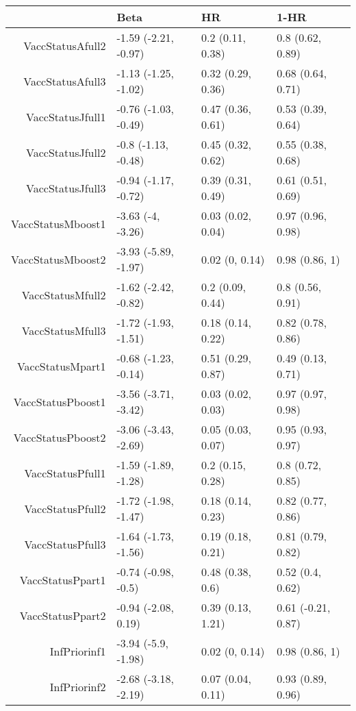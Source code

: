\begin{table}[ht]
\centering
\begin{tabular}{rlll}
  \hline
 & Beta & HR & 1-HR \\ 
  \hline
VaccStatusAfull2 & -1.59 (-2.21, -0.97) & 0.2 (0.11, 0.38) & 0.8 (0.62, 0.89) \\ 
  VaccStatusAfull3 & -1.13 (-1.25, -1.02) & 0.32 (0.29, 0.36) & 0.68 (0.64, 0.71) \\ 
  VaccStatusJfull1 & -0.76 (-1.03, -0.49) & 0.47 (0.36, 0.61) & 0.53 (0.39, 0.64) \\ 
  VaccStatusJfull2 & -0.8 (-1.13, -0.48) & 0.45 (0.32, 0.62) & 0.55 (0.38, 0.68) \\ 
  VaccStatusJfull3 & -0.94 (-1.17, -0.72) & 0.39 (0.31, 0.49) & 0.61 (0.51, 0.69) \\ 
  VaccStatusMboost1 & -3.63 (-4, -3.26) & 0.03 (0.02, 0.04) & 0.97 (0.96, 0.98) \\ 
  VaccStatusMboost2 & -3.93 (-5.89, -1.97) & 0.02 (0, 0.14) & 0.98 (0.86, 1) \\ 
  VaccStatusMfull2 & -1.62 (-2.42, -0.82) & 0.2 (0.09, 0.44) & 0.8 (0.56, 0.91) \\ 
  VaccStatusMfull3 & -1.72 (-1.93, -1.51) & 0.18 (0.14, 0.22) & 0.82 (0.78, 0.86) \\ 
  VaccStatusMpart1 & -0.68 (-1.23, -0.14) & 0.51 (0.29, 0.87) & 0.49 (0.13, 0.71) \\ 
  VaccStatusPboost1 & -3.56 (-3.71, -3.42) & 0.03 (0.02, 0.03) & 0.97 (0.97, 0.98) \\ 
  VaccStatusPboost2 & -3.06 (-3.43, -2.69) & 0.05 (0.03, 0.07) & 0.95 (0.93, 0.97) \\ 
  VaccStatusPfull1 & -1.59 (-1.89, -1.28) & 0.2 (0.15, 0.28) & 0.8 (0.72, 0.85) \\ 
  VaccStatusPfull2 & -1.72 (-1.98, -1.47) & 0.18 (0.14, 0.23) & 0.82 (0.77, 0.86) \\ 
  VaccStatusPfull3 & -1.64 (-1.73, -1.56) & 0.19 (0.18, 0.21) & 0.81 (0.79, 0.82) \\ 
  VaccStatusPpart1 & -0.74 (-0.98, -0.5) & 0.48 (0.38, 0.6) & 0.52 (0.4, 0.62) \\ 
  VaccStatusPpart2 & -0.94 (-2.08, 0.19) & 0.39 (0.13, 1.21) & 0.61 (-0.21, 0.87) \\ 
  InfPriorinf1 & -3.94 (-5.9, -1.98) & 0.02 (0, 0.14) & 0.98 (0.86, 1) \\ 
  InfPriorinf2 & -2.68 (-3.18, -2.19) & 0.07 (0.04, 0.11) & 0.93 (0.89, 0.96) \\ 

\end{tabular}
\end{table}
